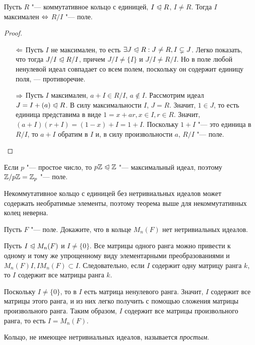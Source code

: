 \begin{theorem}
	Пусть $R$ "--- коммутативное кольцо с единицей, $I \hm\normal R$, $I \ne R$. Тогда $I$ максимален $\Leftrightarrow$ $R / I$ "--- поле.
\end{theorem}

\begin{proof}~
	\begin{itemize}
		\item[$\Leftarrow$] Пусть $I$ не максимален, то есть $\exists J \trianglelefteqslant R: J \ne R, I \subsetneq J$. Легко показать, что тогда $J / I \trianglelefteqslant R / I$, причем $J / I \ne \{I\}$ и $J / I \ne R / I$. Но в поле любой ненулевой идеал совпадает со всем полем, поскольку он содержит единицу поля, --- противоречие.
		\item[$\Rightarrow$] Пусть $I$ максимален, $a + I \in R / I$, $a \not\in I$. Рассмотрим идеал $J = I + (a) \trianglelefteqslant R$. В силу максимальности $I$, $J = R$. Значит, $1 \in J$, то есть единица представима в виде $1 = x + ar, x \in I, r \in R$. Значит, $(a + I)(r + I) = (1 - x) + I = 1 + I$. Поскольку $1 + I$ "--- это единица в $R / I$, то $a + I$ обратим в $I$ и, в силу произвольности $a$, $R / I$ "--- поле.
	\end{itemize}
\end{proof}

\begin{note}
	Если $p$ "--- простое число, то $p\mathbb{Z} \trianglelefteqslant \mathbb{Z}$ "--- максимальный идеал, поэтому $\Z / p\Z \hm= \Z_p$ "--- поле.
\end{note}

\begin{note}
	Некоммутативное кольцо с единицей без нетривиальных идеалов может содержать необратимые элементы, поэтому теорема выше для некоммутативных колец неверна.
\end{note}

\begin{exercise}
	Пусть $F$ "--- поле. Докажите, что в кольце $M_n(F)$ нет нетривиальных идеалов.
\end{exercise}

\begin{solution}
	Пусть $I \trianglelefteqslant M_n(F)$ и $I \ne \{0\}$. Все матрицы одного ранга можно привести к одному и тому же упрощенному виду элементарными преобразованиями и $M_n(F)I, IM_n(F) \subset I$. Следовательно, если $I$ содержит одну матрицу ранга $k$, то $I$ содержит все матрицы ранга $k$.
	
	Поскольку $I \ne \{0\}$, то в $I$ есть матрица ненулевого ранга. Значит, $I$ содержит все матрицы этого ранга, и из них легко получить с помощью сложения матрицы произвольного ранга. Таким образом, $I$ содержит все матрицы произвольного ранга, то есть $I = M_n(F)$.
\end{solution}

\begin{definition}
	Кольцо, не имеющее нетривиальных идеалов, называется \textit{простым}.
\end{definition}